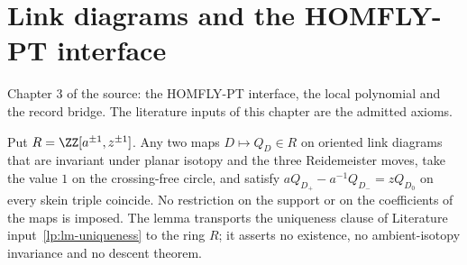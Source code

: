 \chapter{Link diagrams and the HOMFLY-PT interface}
Chapter 3 of the source: the HOMFLY-PT interface, the local polynomial and the record bridge. The literature inputs of this chapter are the admitted axioms.

\begin{lemma}
\label{lp:coefficient-transport}\leanok
Put $R=\ZZ[a^{\pm1},z^{\pm1}]$. Any two maps $D\mapsto Q_D\in R$ on oriented
link diagrams that are invariant under planar isotopy and the three
Reidemeister moves, take the value $1$ on the crossing-free circle, and
satisfy $aQ_{D_+}-a^{-1}Q_{D_-}=zQ_{D_0}$ on every skein triple coincide.
No restriction on the support or on the coefficients of the maps is imposed.
The lemma transports the uniqueness clause of Literature
input~\ref{lp:lm-uniqueness} to the ring $R$; it asserts no existence, no
ambient-isotopy invariance and no descent theorem.

\end{lemma}
